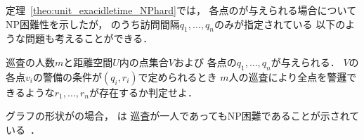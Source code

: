 定理~\ref{theo:unit_exacidletime_NPhard}では，
各点の{\exactIdletime}が与えられる場合についてNP困難性を示したが，
{\exactIdletime}のうち訪問間隔$q_1, \ldots, q_n$のみが指定されている
以下のような問題も考えることができる．

\begin{intervalSpecifiedPatrollingProblemDecision}
巡査の人数$m$と距離空間$U$内の点集合$V$および
各点の{\exactInterval}$q_1, \ldots, q_n$が与えられる．
$V$の各点$v_i$の警備の条件が{\exactIdletime}$(q_i, r_i)$で定められるとき
$m$人の巡査により全点を警邏できるような$r_1, \ldots, r_n$が存在するか判定せよ．
\end{intervalSpecifiedPatrollingProblemDecision}

グラフの形状が{\graphUnit}の場合，
{\intervalSpecifiedPatProbDecision}は
巡査が一人であってもNP困難であることが示されている~\cite{kawamura2015simple}．




